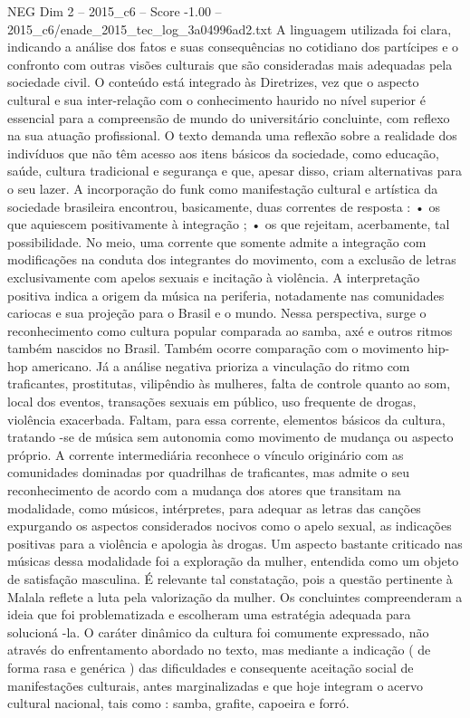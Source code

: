 \begin{textsample}{NEG Dim 2 – 2015\_c6 – Score -1.00 – 2015\_c6/enade\_2015\_tec\_log\_3a04996ad2.txt}
A linguagem utilizada foi clara, indicando a análise dos fatos e suas consequências no cotidiano dos partícipes e o confronto com outras visões culturais que são consideradas mais adequadas pela sociedade civil.
O conteúdo está integrado às Diretrizes, vez que o aspecto cultural e sua inter-relação com o conhecimento haurido no nível superior é essencial para a compreensão de mundo do universitário concluinte, com reflexo na sua atuação profissional.
O texto demanda uma reflexão sobre a realidade dos indivíduos que não têm acesso aos itens básicos da sociedade, como educação, saúde, cultura tradicional e segurança e que, apesar disso, criam alternativas para o seu lazer.
A incorporação do funk como manifestação cultural e artística da sociedade brasileira encontrou, basicamente, duas correntes de resposta : • os que aquiescem positivamente à integração ; • os que rejeitam, acerbamente, tal possibilidade.
No meio, uma corrente que somente admite a integração com modificações na conduta dos integrantes do movimento, com a exclusão de letras exclusivamente com apelos sexuais e incitação à violência.
A interpretação positiva indica a origem da música na periferia, notadamente nas comunidades cariocas e sua projeção para o Brasil e o mundo.
Nessa perspectiva, surge o reconhecimento como cultura popular comparada ao samba, axé e outros ritmos também nascidos no Brasil.
Também ocorre comparação com o movimento hip-hop americano.
Já a análise negativa prioriza a vinculação do ritmo com traficantes, prostitutas, vilipêndio às mulheres, falta de controle quanto ao som, local dos eventos, transações sexuais em público, uso frequente de drogas, violência exacerbada.
Faltam, para essa corrente, elementos básicos da cultura, tratando -se de música sem autonomia como movimento de mudança ou aspecto próprio.
A corrente intermediária reconhece o vínculo originário com as comunidades dominadas por quadrilhas de traficantes, mas admite o seu reconhecimento de acordo com a mudança dos atores que transitam na modalidade, como músicos, intérpretes, para adequar as letras das canções expurgando os aspectos considerados nocivos como o apelo sexual, as indicações positivas para a violência e apologia às drogas.
Um aspecto bastante criticado nas músicas dessa modalidade foi a exploração da mulher, entendida como um objeto de satisfação masculina.
É relevante tal constatação, pois a questão pertinente à Malala reflete a luta pela valorização da mulher.
Os concluintes compreenderam a ideia que foi problematizada e escolheram uma estratégia adequada para solucioná -la.
O caráter dinâmico da cultura foi comumente expressado, não através do enfrentamento abordado no texto, mas mediante a indicação ( de forma rasa e genérica ) das dificuldades e consequente aceitação social de manifestações culturais, antes marginalizadas e que hoje integram o acervo cultural nacional, tais como : samba, grafite, capoeira e forró.

\end{textsample}
